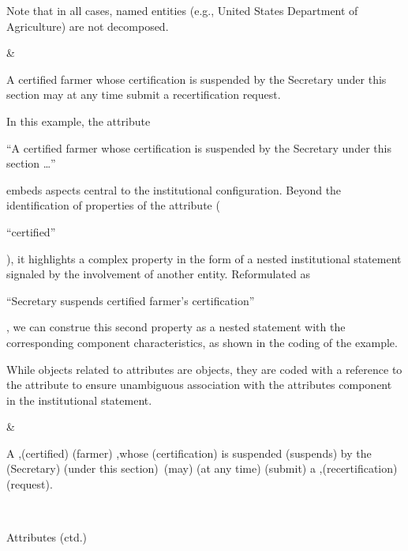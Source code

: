 \begin{landscape}
\begin{longtable}{\tabledims}
Note that in all cases, named entities (e.g., United States Department of Agriculture) are not decomposed.

&

\newline
\begin{exi}A certified farmer whose certification is suspended by the Secretary under this section may at any time submit a recertification request.\end{exi}

\sp

In this example, the attribute  \begin{exi}``A certified farmer whose certification is suspended by the Secretary under this section \dots''\end{exi} embeds aspects central to the institutional configuration. Beyond the identification of properties of the attribute (\begin{exi}``certified''\end{exi}), it highlights a complex property in the form of a nested institutional statement signaled by the involvement of another entity. Reformulated as \begin{exi}``Secretary suspends certified farmer's certification''\end{exi}, we can construe this second property as a nested statement with the corresponding component characteristics, as shown in the coding of the example. 

\sp

While objects related to attributes are objects, they are coded with a reference to the attribute to ensure unambiguous association with the attributes component in the institutional statement.

&

\vspace{0.05cm}

\begin{exi}A \A{},(certified) \A{}(farmer) \A{},\lb whose  \Bdir{}(certification) is suspended \I{}(\lsi suspends\rsi) by the \A{}(Secretary) \Cex{}(under this section)\rb~\D{}(may) \Cac{}(at any time) \I{}(submit) a  \Bdir,\prop{}(recertification) \Bdir{}(request).\end{exi}

\\

\begin{emp}Attributes (ctd.)\end{emp}


\end{longtable}
\end{landscape}
